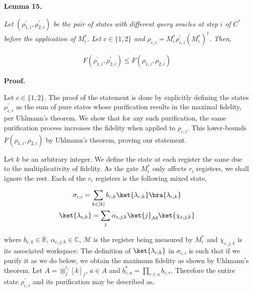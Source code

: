 

\par\medskip\noindent\textbf{
\textbf{Lemma 15}\textbf{.}
}\par



\emph{Let $(\rho^{\prime}_{1,i},\rho^{\prime}_{2,i})$ be the pair of states with different query oracles at step $i$ of $C^{*}$ before the application of $M^{*}_{i}$. Let $c\in\{1,2\}$ and $\rho_{c,i}=M^{*}_{i}\rho^{\prime}_{c,i}(M^{*}_{i})^{\dagger}$. Then,}\par


\[\begin{gathered}
\displaystyle F(\rho^{\prime}_{1,i},\rho^{\prime}_{2,i})\leq F(\rho_{1,i},\rho_{2,i})
\end{gathered}\]







\par\medskip\noindent\textbf{Proof.}\par




Let $c\in\{1,2\}$. The proof of the statement is done by explicitly defining the states $\rho^{\prime}_{c,i}$ as the sum of pure states whose purification results in the maximal fidelity, per Uhlmann’s theorem. We show that for any such purification, the same purification process increases the fidelity when applied to $\rho_{c,i}$. This lower-bounds $F(\rho_{1,i},\rho_{2,i})$ by Uhlmann’s theorem, proving our statement.\par




Let $k$ be an arbitrary integer. We define the state at each register the same due to the multiplicativity of fidelity.
As the gate $M^{*}_{i}$ only affects $r_{i}$ registers, we shall ignore the rest. Each of the $r_{i}$ registers is the following mixed state,\par


\[\begin{gathered}
\displaystyle\sigma_{c,i} \displaystyle=\sum_{k\in[k]}b_{c,k}\ket{\lambda_{c,k}}\bra{\lambda_{c,k}} \\
\displaystyle\ket{\lambda_{c,k}} \displaystyle=\sum_{j}\alpha_{c,j,k}\ket{j}_{\mathcal{M}}\ket{\chi_{c,j,k}}
\end{gathered}\]


where $b_{c,k}\in\mathbb{R}$, $\alpha_{c,j,k}\in\mathbb{C}$, $\mathcal{M}$ is the register being measured by $M_{i}^{*}$ and $\chi_{c,j,k}$ is its associated workspace.
The definition of $\ket{\lambda_{c,k}}$ in $\sigma_{c,i}$ is such that if we purify it as we do below, we obtain the maximum fidelity as shown by Uhlmann’s theorem.
Let $A=\otimes_{j}^{r_{i}}[k]_{j}$, $a\in A$ and $b^{*}_{c,a}=\prod_{r\in a}b_{c,r}$.
Therefore the entire state $\rho^{\prime}_{c,i}$ and its purification may be described as,\par




